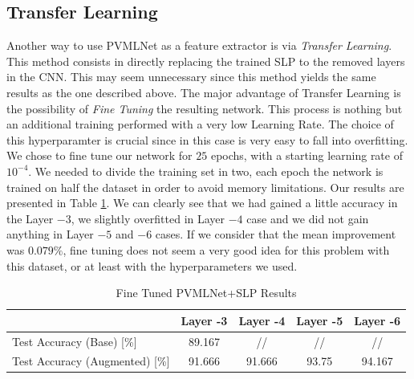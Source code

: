 \documentclass[10pt,a4paper]{report}
\begin{document}
\subsection{Transfer Learning}
Another way to use PVMLNet as a feature extractor is via \textit{Transfer Learning}. This method consists in directly replacing the trained SLP to the removed layers in the CNN. This may seem unnecessary since this method yields the same results as the one described above. The major advantage of Transfer Learning is the possibility of \textit{Fine Tuning} the resulting network. This process is nothing but an additional training performed with a very low Learning Rate. The choice of this hyperparamter is crucial since in this case is very easy to fall into overfitting. We chose to fine tune our network for $25$ epochs, with a starting learning rate of $10^{-4}$. We needed to divide the training set in two, each epoch the network is trained on half the dataset in order to avoid memory limitations. Our results are presented in Table \ref{tab:ftft-pvmlnet}. We can clearly see that we had gained a little accuracy in the Layer $-3$, we slightly overfitted in Layer $-4$ case and we did not gain anything in Layer $-5$ and $-6$ cases. If we consider that the mean improvement was $0.079 \%$, fine tuning does not seem a very good idea for this problem with this dataset, or at least with the hyperparameters we used. 
\begin{table}[!ht]
\centering
\begin{tabular}{|l|c|c|c|c|}
\hline
                                   & Layer -3 & Layer -4 & Layer -5 & Layer -6 \\ \hline
Test Accuracy (Base) {[}\%{]}      & 89.167   & //       & //       & //       \\ \hline
Test Accuracy (Augmented) {[}\%{]} & 91.666   & 91.666   & 93.75    & 94.167   \\ \hline
\end{tabular}
\caption{Fine Tuned PVMLNet+SLP Results}
\label{tab:ftft-pvmlnet}
\end{table} 
\end{document}
